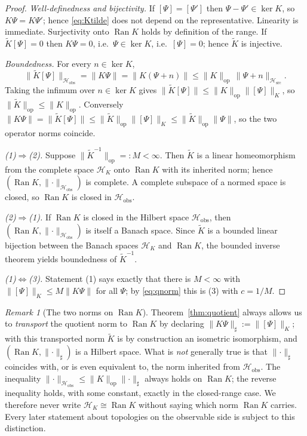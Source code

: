 \documentclass[11pt,reqno]{amsart}
\numberwithin{equation}{section}
\theoremstyle{plain}
\theoremstyle{definition}
\theoremstyle{remark}
\newtheorem{remark}[theorem]{Remark}
\newcommand{\Hsrc}{\mathcal{H}_{\mathrm{src}}}
\newcommand{\Hobs}{\mathcal{H}_{\mathrm{obs}}}
\newcommand{\HK}{\mathcal{H}_{K}}
\newcommand{\Ran}{\operatorname{Ran}}
\newcommand{\Kt}{\widetilde{K}}
\begin{document}
\begin{proof}
\emph{Well-definedness and bijectivity.} If $[\Psi]=[\Psi']$ then $\Psi-\Psi'\in\ker K$, so
$K\Psi=K\Psi'$; hence \eqref{eq:Ktilde} does not depend on the representative. Linearity is
immediate. Surjectivity onto $\Ran K$ holds by definition of the range. If $\Kt[\Psi]=0$
then $K\Psi=0$, i.e.\ $\Psi\in\ker K$, i.e.\ $[\Psi]=0$; hence $\Kt$ is injective.

\emph{Boundedness.} For every $n\in\ker K$,
\[
\lVert\Kt[\Psi]\rVert_{\Hobs}=\lVert K\Psi\rVert=\lVert K(\Psi+n)\rVert
\le\lVert K\rVert_{\mathrm{op}}\,\lVert\Psi+n\rVert_{\Hsrc}.
\]
Taking the infimum over $n\in\ker K$ gives
$\lVert\Kt[\Psi]\rVert\le\lVert K\rVert_{\mathrm{op}}\lVert[\Psi]\rVert_{K}$, so
$\lVert\Kt\rVert_{\mathrm{op}}\le\lVert K\rVert_{\mathrm{op}}$. Conversely
$\lVert K\Psi\rVert=\lVert\Kt[\Psi]\rVert\le\lVert\Kt\rVert_{\mathrm{op}}\lVert[\Psi]\rVert_{K}
\le\lVert\Kt\rVert_{\mathrm{op}}\lVert\Psi\rVert$, so the two operator norms coincide.

\emph{(1)$\Rightarrow$(2).} Suppose $\lVert\Kt^{-1}\rVert_{\mathrm{op}}=:M<\infty$. Then
$\Kt$ is a linear homeomorphism from the complete space $\HK$ onto $\Ran K$ with its
inherited norm; hence $(\Ran K,\lVert\cdot\rVert_{\Hobs})$ is complete. A complete
subspace of a normed space is closed, so $\Ran K$ is closed in $\Hobs$.

\emph{(2)$\Rightarrow$(1).} If $\Ran K$ is closed in the Hilbert space $\Hobs$, then
$(\Ran K,\lVert\cdot\rVert_{\Hobs})$ is itself a Banach space. Since $\Kt$ is a bounded
linear bijection between the Banach spaces $\HK$ and $\Ran K$, the bounded inverse theorem
\cite[Cor.~2.7]{Brezis} yields boundedness of $\Kt^{-1}$.

\emph{(1)$\Leftrightarrow$(3).} Statement (1) says exactly that there is $M<\infty$ with
$\lVert[\Psi]\rVert_{K}\le M\lVert K\Psi\rVert$ for all $\Psi$; by \eqref{eq:qnorm} this is
(3) with $c=1/M$.
\end{proof}

\begin{remark}[The two norms on $\Ran K$]
\label{rem:twonorms}
Theorem~\ref{thm:quotient} always allows us to \emph{transport} the quotient norm to
$\Ran K$ by declaring $\lVert K\Psi\rVert_{\sharp}:=\lVert[\Psi]\rVert_{K}$; with this
transported norm $\Kt$ is by construction an isometric isomorphism, and
$(\Ran K,\lVert\cdot\rVert_{\sharp})$ is a Hilbert space. What is \emph{not} generally true
is that $\lVert\cdot\rVert_{\sharp}$ coincides with, or is even equivalent to, the norm
inherited from $\Hobs$. The inequality $\lVert\cdot\rVert_{\Hobs}\le\lVert K\rVert_{\mathrm{op}}
\lVert\cdot\rVert_{\sharp}$ always holds on $\Ran K$; the reverse inequality holds, with
some constant, exactly in the closed-range case. We therefore never write
$\HK\cong\Ran K$ without saying which norm $\Ran K$ carries. Every later statement about
topologies on the observable side is subject to this distinction.
\end{remark}
\end{document}
